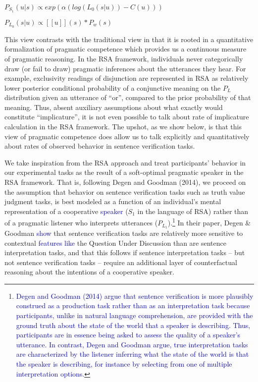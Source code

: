\documentclass[man]{apa6}
\newcommand{\change}[1]{\textcolor{Blue}{#1}}
\theoremstyle{definition}
\theoremstyle{definition}
\theoremstyle{definition}
\theoremstyle{remark}
\begin{document}
\(P_{S_1}(u | s) \propto exp(\alpha(log(L_0(s | u)) - C(u)))\)

\(P_{L_0}(s | u) \propto [[u]](s) * P_w(s)\)

This view contrasts with the traditional view in that it is rooted in a
quantitative formalization of pragmatic competence which provides us a
continuous measure of pragmatic reasoning. In the RSA framework,
individuals never categorically draw (or fail to draw) pragmatic
inferences about the utterances they hear. For example, exclusivity
readings of disjunction are represented in RSA as relatively lower
posterior conditional probability of a conjunctive meaning on the
\(P_L\) distribution given an utterance of \enquote{or}, compared to the
prior probability of that meaning. Thus, absent auxiliary assumptions
about what exactly would constitute \enquote{implicature}, it is not
even possible to talk about rate of implicature calculation in the RSA
framework. The upshot, as we show below, is that this view of pragmatic
competence does allow us to talk explicitly and quantitatively about
rates of observed behavior in sentence verification tasks.

We take inspiration from the RSA approach and treat participants'
behavior in our experimental tasks as the result of a soft-optimal
pragmatic speaker in the RSA framework. That is, following Degen and
Goodman (2014), we proceed on the assumption that behavior on sentence
verification tasks such as truth value judgment tasks, is best modeled
as a function of an individual's mental representation of a cooperative
\change{speaker} (\(S_1\) in the language of RSA) rather than of a pragmatic
listener who interprets utterances (\(P_{L_1}\)).\footnote{\change{Degen and Goodman (2014) argue that sentence verification is more plausibly construed as a production task rather than as an interpretation task because participants, unlike in natural language comprehension, are provided with the ground truth about the state of the world that a speaker is describing. Thus, participants are in essence being asked to assess the quality of a speaker's utterance. In contrast, Degen and Goodman argue, true interpretation tasks are characterized by the listener inferring what the state of the world is that the speaker is describing, for instance by selecting from one of multiple interpretation options.}} In their paper, Degen
\& Goodman \change{show} that sentence verification tasks are relatively more
sensitive to contextual \change{features like} the
Question Under Discussion than are sentence interpretation tasks, and
that this follows if sentence interpretation tasks -- but not sentence
verification tasks -- require an additional layer of counterfactual
reasoning about the intentions of a cooperative speaker.
\end{document}
